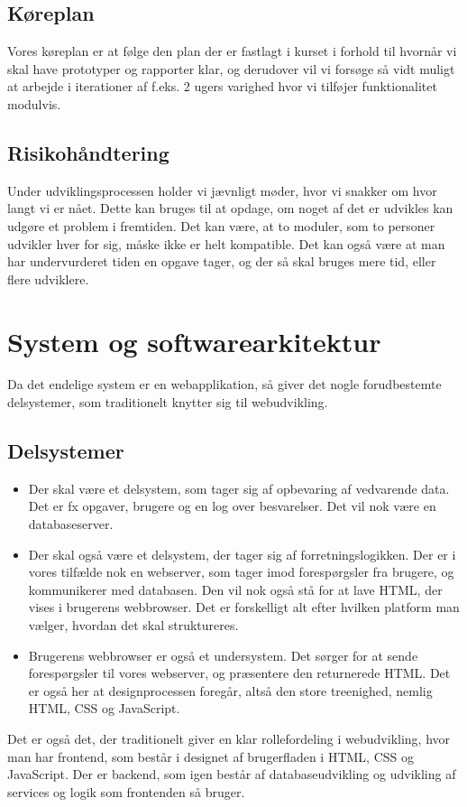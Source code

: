 \documentclass[12pt]{article}
\begin{document}
\subsection{Køreplan}
Vores køreplan er at følge den plan der er fastlagt i kurset i forhold til hvornår vi skal have prototyper og rapporter klar, og derudover vil vi forsøge så vidt muligt at arbejde i iterationer af f.eks. 2 ugers varighed hvor vi tilføjer funktionalitet modulvis.
\subsection{Risikohåndtering}
Under udviklingsprocessen holder vi jævnligt møder, hvor vi snakker om hvor langt vi er nået. Dette kan bruges til at opdage, om noget af det er udvikles kan udgøre et problem i fremtiden. Det kan være, at to moduler, som to personer udvikler hver for sig, måske ikke er helt kompatible. Det kan også være at man har undervurderet tiden en opgave tager, og der så skal bruges mere tid, eller flere udviklere.


\section{System og softwarearkitektur}
Da det endelige system er en webapplikation, så giver det nogle forudbestemte delsystemer, som traditionelt knytter sig til webudvikling.
\subsection{Delsystemer}
\begin{itemize}
    \item Der skal være et delsystem, som tager sig af opbevaring af vedvarende data. Det er fx opgaver, brugere og en log over besvarelser. Det vil nok være en databaseserver.
    \item Der skal også være et delsystem, der tager sig af forretningslogikken. Der er i vores tilfælde nok en webserver, som tager imod forespørgsler fra brugere, og kommunikerer med databasen. Den vil nok også stå for at lave HTML, der vises i brugerens webbrowser. Det er forskelligt alt efter hvilken platform man vælger, hvordan det skal struktureres.
    \item Brugerens webbrowser er også et undersystem. Det sørger for at sende forespørgsler til vores webserver, og præsentere den returnerede HTML. Det er også her at designprocessen foregår, altså den store treenighed, nemlig HTML, CSS og JavaScript.
\end{itemize}
Det er også det, der traditionelt giver en klar rollefordeling i webudvikling, hvor man har frontend, som består i designet af brugerfladen i HTML, CSS og JavaScript. Der er backend, som igen består af databaseudvikling og udvikling af services og logik som frontenden så bruger.
\end{document}

